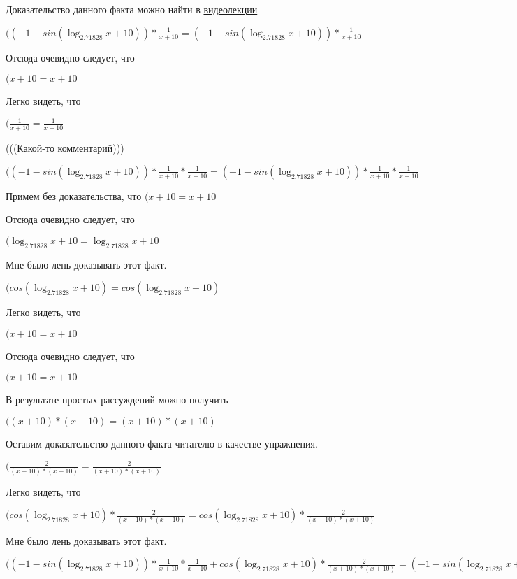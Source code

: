 \documentclass[12pt,a4paper,fleqn]{article}
\theoremstyle{definition}
\begin{document}
Доказательство данного факта можно найти в \href{https://www.youtube.com/watch?v=dQw4w9WgXcQ}{видеолекции}

$(( -1  - sin(\log_{ 2.71828 }{ x  +  10 })) * \frac{ 1 }{ x  +  10 }
 = ( -1  - sin(\log_{ 2.71828 }{ x  +  10 })) * \frac{ 1 }{ x  +  10 }
$

Отсюда очевидно следует, что

$( x  +  10  =  x  +  10 $

Легко видеть, что

$(\frac{ 1 }{ x  +  10 }
 = \frac{ 1 }{ x  +  10 }
$

(((Какой-то комментарий)))

$(( -1  - sin(\log_{ 2.71828 }{ x  +  10 })) * \frac{ 1 }{ x  +  10 }
 * \frac{ 1 }{ x  +  10 }
 = ( -1  - sin(\log_{ 2.71828 }{ x  +  10 })) * \frac{ 1 }{ x  +  10 }
 * \frac{ 1 }{ x  +  10 }
$

Примем без доказательства, что
$( x  +  10  =  x  +  10 $

Отсюда очевидно следует, что

$(\log_{ 2.71828 }{ x  +  10 } = \log_{ 2.71828 }{ x  +  10 }$

Мне было лень доказывать этот факт.

$(cos(\log_{ 2.71828 }{ x  +  10 }) = cos(\log_{ 2.71828 }{ x  +  10 })$

Легко видеть, что

$( x  +  10  =  x  +  10 $

Отсюда очевидно следует, что

$( x  +  10  =  x  +  10 $

В результате простых рассуждений можно получить

$(( x  +  10 ) * ( x  +  10 ) = ( x  +  10 ) * ( x  +  10 )$

Оставим доказательство данного факта читателю в качестве упражнения.

$(\frac{ -2 }{( x  +  10 ) * ( x  +  10 )}
 = \frac{ -2 }{( x  +  10 ) * ( x  +  10 )}
$

Легко видеть, что

$(cos(\log_{ 2.71828 }{ x  +  10 }) * \frac{ -2 }{( x  +  10 ) * ( x  +  10 )}
 = cos(\log_{ 2.71828 }{ x  +  10 }) * \frac{ -2 }{( x  +  10 ) * ( x  +  10 )}
$

Мне было лень доказывать этот факт.

$(( -1  - sin(\log_{ 2.71828 }{ x  +  10 })) * \frac{ 1 }{ x  +  10 }
 * \frac{ 1 }{ x  +  10 }
 + cos(\log_{ 2.71828 }{ x  +  10 }) * \frac{ -2 }{( x  +  10 ) * ( x  +  10 )}
 = ( -1  - sin(\log_{ 2.71828 }{ x  +  10 })) * \frac{ 1 }{ x  +  10 }
 * \frac{ 1 }{ x  +  10 }
 + cos(\log_{ 2.71828 }{ x  +  10 }) * \frac{ -2 }{( x  +  10 ) * ( x  +  10 )}
$
\end{document}
